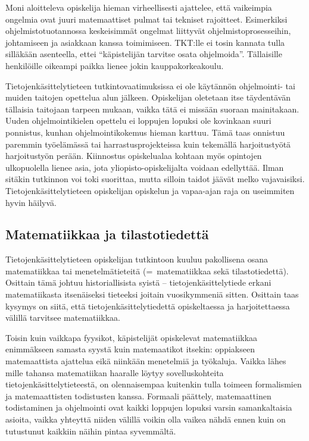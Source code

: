 \documentclass[../ala_hataile.tex]{subfiles}
\begin{document}
	Moni aloitteleva opiskelija hieman virheellisesti
	ajattelee, että vaikeimpia ongelmia
	ovat juuri matemaattiset pulmat tai
	tekniset rajoitteet. Esimerkiksi ohjelmistotuotannossa
	keskeisimmät ongelmat liittyvät
	ohjelmistoprosesseihin, johtamiseen ja
	asiakkaan kanssa toimimiseen. TKT:lle
	ei tosin kannata tulla silläkään asenteella,
	ettei ``käpistelijän tarvitse osata ohjelmoida''.
	Tällaisille henkilöille oikeampi paikka
	lienee jokin kauppakorkeakoulu.
	
	Tietojen\-käsittely\-tieteen tutkinto\-vaatimuksissa
	ei ole käytännön ohjelmointi- tai
	muiden taitojen opettelua alun jälkeen.
	Opiskelijan oletetaan itse täydentävän tällaisia
	taitojaan tarpeen mukaan, vaikka tätä
	ei missään suoraan mainitakaan. Uuden
	ohjelmointikielen opettelu ei loppujen lopuksi
	ole kovinkaan suuri ponnistus, kunhan
	ohjelmointi\-kokemus hieman karttuu.
	Tämä taas onnistuu paremmin työelämässä
	tai harrastusprojekteissa kuin tekemällä
	harjoitustyötä harjoitustyön perään. Kiinnostus
	opiskelualaa kohtaan myös opintojen
	ulkopuolella lienee asia, jota yliopisto-opiskelijalta voidaan edellyttää. Ilman
	sitäkin tutkinnon voi toki suorittaa, mutta
	silloin taidot jäävät melko vajavaisiksi.
	Tietojen\-käsittely\-tieteen opiskelijan opiskelun
	ja vapaa-ajan raja on useimmiten hyvin
	häilyvä.
	
	\subsection*{Matematiikkaa ja tilastotiedettä}
	Tietojen\-käsittely\-tieteen opiskelijan
	tutkintoon kuuluu pakollisena osana
	matematiikkaa tai menetelmätieteitä
	(=~matematiikkaa sekä tilastotiedettä). Osittain
	tämä johtuu historiallisista syistä -- tietojen\-käsittely\-tiede
	erkani matematiikasta
	itsenäiseksi tieteeksi joitain vuosikymmeniä
	sitten. Osittain taas kysymys on siitä,
	että tietojen\-käsittely\-tiedettä opiskeltaessa
	ja harjoitettaessa välillä tarvitsee matematiikkaa.
	
	Toisin kuin vaikkapa fyysikot, käpistelijät
	opiskelevat matematiikkaa enimmäkseen
	samasta syystä kuin matemaatikot
	itsekin: oppiakseen matemaattista ajattelua
	eikä niinkään menetelmiä ja työkaluja.
	Vaikka lähes mille tahansa matematiikan
	haaralle löytyy sovelluskohteita tietojen\-käsittely\-tieteestä,
	on olennaisempaa kuitenkin
	tulla toimeen formalismien ja matemaattisten
	todistusten kanssa. Formaali
	päättely, matemaattinen todistaminen ja
	ohjelmointi ovat kaikki loppujen lopuksi
	varsin samankaltaisia asioita, vaikka yhteyttä
	niiden välillä voikin olla vaikea nähdä
	ennen kuin on tutustunut kaikkiin näihin
	pintaa syvemmältä.
	
\end{document}
